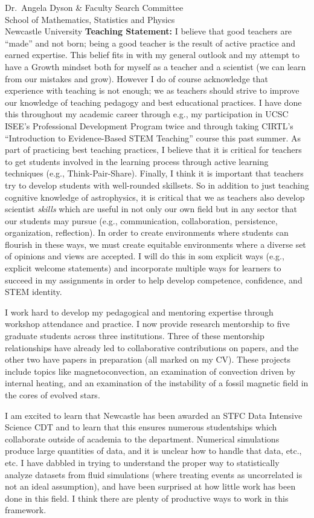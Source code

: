 \documentclass[12pt]{letter}
\begin{document}
\begin{letter}{
        Dr.~Angela Dyson \& Faculty Search Committee \\
        School of Mathematics, Statistics and Physics \\
        Newcastle University}
    \textbf{Teaching Statement:} I believe that good teachers are ``made'' and not born; being a good teacher is the result of active practice and earned expertise.
    This belief fits in with my general outlook and my attempt to have a Growth mindset both for myself as a teacher and a scientist (we can learn from our mistakes and grow).
    However I do of course acknowledge that experience with teaching is not enough; we as teachers should strive to improve our knowledge of teaching pedagogy and best educational practices.
    I have done this throughout my academic career through e.g., my participation in UCSC ISEE's Professional Development Program twice and through taking CIRTL's ``Introduction to Evidence-Based STEM Teaching'' course this past summer.
    As part of practicing best teaching practices, I believe that it is critical for teachers to get students involved in the learning process through active learning techniques (e.g., Think-Pair-Share).
    Finally, I think it is important that teachers try to develop students with well-rounded skillsets.
    So in addition to just teaching cognitive knowledge of astrophysics, it is critical that we as teachers also develop scientist \emph{skills} which are useful in not only our own field but in any sector that our students may pursue (e.g., communication, collaboration, persistence, organization, reflection).
    In order to create environments where students can flourish in these ways, we must create equitable environments where a diverse set of opinions and views are accepted.
    I will do this in som explicit ways (e.g., explicit welcome statements) and incorporate multiple ways for learners to succeed in my assignments in order to help develop competence, confidence, and STEM identity.

    I work hard to develop my pedagogical and mentoring expertise through workshop attendance and practice.
    I now provide research mentorship to five graduate students across three institutions.
    Three of these mentorship relationships have already led to collaborative contributions on papers, and the other two have papers in preparation (all marked on my CV).
    These projects include topics like magnetoconvection, an examination of convection driven by internal heating, and an examination of the instability of a fossil magnetic field in the cores of evolved stars.

    I am excited to learn that Newcastle has been awarded an STFC Data Intensive Science CDT and to learn that this ensures numerous studentships which collaborate outside of academia to the department.
    Numerical simulations produce large quantities of data, and it is unclear how to handle that data, etc., etc.
    I have dabbled in trying to understand the proper way to statistically analyze datasets from fluid simulations (where treating events as uncorrelated is not an ideal assumption), and have been surprised at how little work has been done in this field.
    I think there are plenty of productive ways to work in this framework.


\end{letter}
\end{document}
